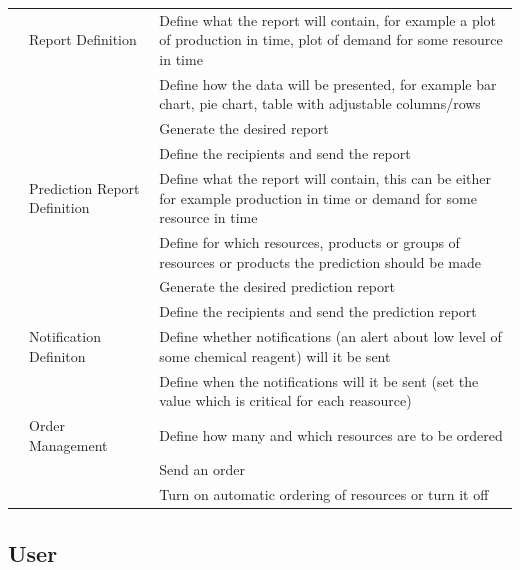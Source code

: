\documentclass[a4paper,11pt,twoside]{report}
\theoremstyle{definition}
\begin{document}
\begin{longtable}{|p{3cm}|p{3cm}|p{10cm}|}
\texttt{} & Report Definition & Define what the report will contain, for example a plot of production in time, plot of demand for some resource in time\\ \cline{3-3}
\texttt{} &  & Define how the data will be presented, for example bar chart, pie chart, table with adjustable columns/rows \\ \cline{3-3}
\texttt{} &  & Generate the desired report \\ \cline{3-3}
\texttt{} &  & Define the recipients and send the report \\ \cline{2-3}
\texttt{} & Prediction Report Definition & Define what the report will contain, this can be either for example production in time or demand for some resource in time\\ \cline{3-3}
\texttt{} &  & Define for which resources, products or groups of resources or products the prediction should be made\\ \cline{3-3}
\texttt{} &  & Generate the desired prediction report \\ \cline{3-3}

\texttt{} &  & Define the recipients and send the prediction report \\ \cline{2-3}
\texttt{} & Notification Definiton & Define whether notifications (an alert about low level of some chemical reagent) will it be sent\\ \cline{3-3}
\texttt{} &  & Define when the notifications will it be sent (set the value which is critical for each reasource)\\ \cline{2-3}
\texttt{} & Order Management & Define how many and which resources are to be ordered\\ \cline{3-3}
\texttt{} & & Send an order\\ \cline{3-3}
\texttt{} & & Turn on automatic ordering of resources or turn it off\\ \hline

\end{longtable}



\subsection{User}
\end{document}
